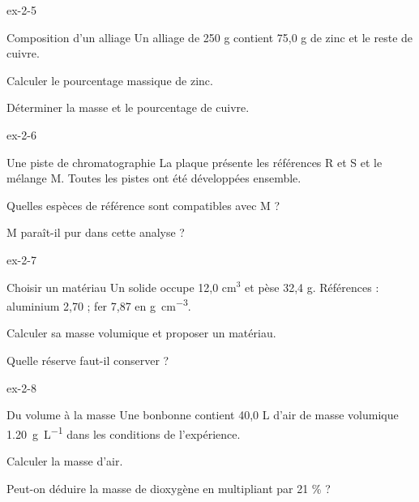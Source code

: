 \begin{blocLivre}{ex-2-5}\begin{exercice}[2]{Composition d’un alliage}
Un alliage de 250 g contient 75,0 g de zinc et le reste de cuivre.
\begin{questions}
\item Calculer le pourcentage massique de zinc.
\item Déterminer la masse et le pourcentage de cuivre.
\end{questions}
\end{exercice}\end{blocLivre}
\begin{blocLivre}{ex-2-6}\begin{exercice}[2]{Une piste de chromatographie}
La plaque présente les références R et S et le mélange M. Toutes les pistes ont été développées ensemble.
\begin{questions}
\item Quelles espèces de référence sont compatibles avec M ?
\item M paraît-il pur dans cette analyse ?
\end{questions}
\end{exercice}\end{blocLivre}
\begin{blocLivre}{ex-2-7}\begin{exercice}[2]{Choisir un matériau}
Un solide occupe 12,0 cm$^3$ et pèse 32,4 g. Références : aluminium 2,70 ; fer 7,87 en \unit{g.cm^{-3}}.
\begin{questions}
\item Calculer sa masse volumique et proposer un matériau.
\item Quelle réserve faut-il conserver ?
\end{questions}
\end{exercice}\end{blocLivre}
\begin{blocLivre}{ex-2-8}\begin{exercice}[2]{Du volume à la masse}
Une bonbonne contient 40,0 L d’air de masse volumique \qty{1,20}{g.L^{-1}} dans les conditions de l’expérience.
\begin{questions}
\item Calculer la masse d’air.
\item Peut-on déduire la masse de dioxygène en multipliant par 21 \% ?
\end{questions}
\end{exercice}\end{blocLivre}
